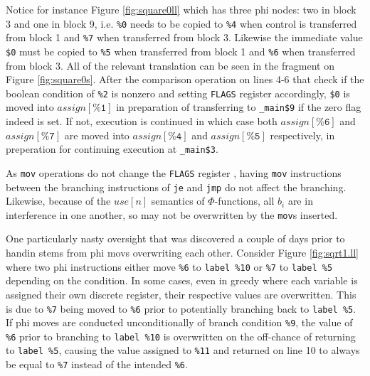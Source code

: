\documentclass{article}
\begin{document}
\noindent Notice for instance Figure \ref{fig:square0ll} which has three phi nodes: two in  block 3 and one in block 9, i.e. \texttt{\%0} needs to be copied to \texttt{\%4} when control is transferred from block 1 and \texttt{\%7} when transferred from block 3. Likewise the immediate value \texttt{\$0} must be copied to \texttt{\%5} when transferred from block 1 and \texttt{\%6} when transferred from block 3.
All of the relevant translation can be seen in the fragment on Figure \ref{fig:square0s}. After the comparison operation on lines 4-6 that check if the boolean condition of \texttt{\%2} is nonzero and setting \texttt{FLAGS} register accordingly, \texttt{\$0} is moved into
\(\mathit{assign}[\texttt{\%1}]\) in preparation
of transferring to \texttt{\_main\$9} if the zero flag indeed is set. If not, execution is continued in which case both \(\mathit{assign}[\texttt{\%6}]\) and \(\mathit{assign}[\texttt{\%7}]\) are moved into \(\mathit{assign}[\texttt{\%4}]\) and \(\mathit{assign}[\texttt{\%5}]\) respectively, in preperation for continuing execution at \texttt{\_main\$3}.

As \texttt{mov} operations do not change the \texttt{FLAGS} register \cite{x86asm}, having \texttt{mov} instructions between the branching instructions of \texttt{je} and \texttt{jmp} do not affect the branching. Likewise, because of the \(\mathit{use}[n]\) semantics of \(\Phi\)-functions, all \(b_i\) are in interference in one another, so may not be overwritten by the \texttt{mov}s inserted.

One particularly nasty oversight that was discovered a couple of days prior to handin stems from phi movs overwriting each other.
Consider Figure \ref{fig:sqrt1.ll} where two phi instructions either move \texttt{\%6} to \texttt{label \%10} or \texttt{\%7} to \texttt{label \%5} depending on the condition. In some cases, even in greedy where each variable is assigned their own discrete register, their respective values are overwritten. This is due to \texttt{\%7} being moved to \texttt{\%6} prior to potentially branching back to \texttt{label \%5}. If phi moves are conducted unconditionally of branch condition \texttt{\%9}, the value of \texttt{\%6} prior to branching to \texttt{label \%10} is overwritten on the off-chance of returning to \texttt{label \%5}, causing the value assigned to \texttt{\%11} and returned on line 10 to always be equal to \texttt{\%7}   instead of the intended  \texttt{\%6}.
\end{document}
